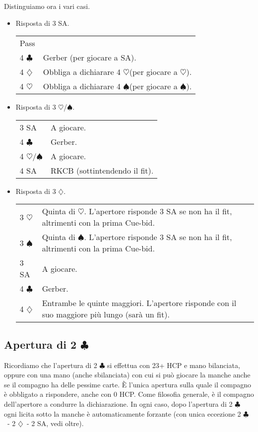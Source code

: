 \documentclass[a4paper,10pt]{article}
\renewcommand{\c}{$\clubsuit$\xspace}
\renewcommand{\d}{$\diamondsuit$\xspace}
\newcommand{\h}{$\heartsuit$\xspace}
\newcommand{\s}{$\spadesuit$\xspace}
\renewcommand{\j}{$\bigstar$\xspace}
\newcommand{\sa}{SA\xspace}
\newcommand{\smallspace}{\vskip0.3cm}
\newenvironment{twocol}
  {\smallspace\noindent\begin{tabular}{l p{0.78\textwidth}}}
  {\end{tabular}\smallspace}
\begin{document}
\noindent Distinguiamo ora i vari casi.
\begin{itemize}
  \item Risposta di 3 \sa.
  \begin{twocol}
    Pass & \\
    4 \c & Gerber (per giocare a \sa).\\
    4 \d & Obbliga a dichiarare 4 \h (per giocare a \h).\\
    4 \h & Obbliga a dichiarare 4 \s (per giocare a \s).\\
  \end{twocol}
  
  \item Risposta di 3 \h/\s.
  \begin{twocol}
    3 \sa & A giocare.\\
    4 \c & Gerber.\\
    4 \h/\s & A giocare.\\
    4 \sa & RKCB (sottintendendo il fit).
  \end{twocol}
  
  \item Risposta di 3 \d.
  \begin{twocol}
    3 \h & Quinta di \h. L'apertore risponde 3 \sa se non ha il fit, altrimenti con la prima Cue-bid.\\
    3 \s & Quinta di \s. L'apertore risponde 3 \sa se non ha il fit, altrimenti con la prima Cue-bid.\\
    3 \sa & A giocare.\\
    4 \c & Gerber.\\
    4 \d & Entrambe le quinte maggiori. L'apertore risponde con il suo maggiore più lungo (sarà un fit).\\
  \end{twocol}
\end{itemize}



\subsection{Apertura di 2 \c}

Ricordiamo che l'apertura di 2 \c si effettua con 23+ HCP e mano bilanciata, oppure con una mano (anche sbilanciata) con cui si può giocare la manche anche se il compagno ha delle pessime carte.
È l'unica apertura sulla quale il compagno è obbligato a rispondere, anche con 0 HCP.
Come filosofia generale, è il compagno dell'apertore a condurre la dichiarazione.
In ogni caso, dopo l'apertura di 2 \c ogni licita sotto la manche è automaticamente forzante (con unica eccezione 2 \c\ - 2 \d\ - 2 \sa, vedi oltre).
\end{document}
